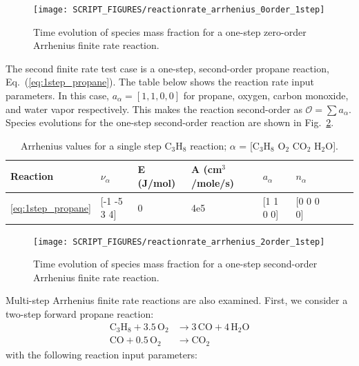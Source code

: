 \documentclass[11pt]{book}
\begin{document}
\begin{figure}[h!]
\centering
\texttt{[image: SCRIPT\_FIGURES/reactionrate\_arrhenius\_0order\_1step]}
\caption[Species evolution in a 0-order 1-step finite rate reaction]{Time evolution of species mass fraction for a one-step zero-order Arrhenius finite rate reaction.}
\label{fig:Arrhenius_0Order_1step}
\end{figure}
The second finite rate test case is a one-step, second-order propane reaction, Eq.~(\ref{eq:1step_propane}). The table below shows the reaction rate input parameters. In this case, $a_{\alpha}=[1,1,0,0]$  for propane, oxygen, carbon monoxide, and water vapor respectively. This makes the reaction second-order as $\mathcal{O}=\sum a_{\alpha}$. Species evolutions for the one-step second-order reaction are shown in Fig.~\ref{fig:Arrhenius_2Order_1step}.
\begin{table}[ht]
\begin{center}
\caption[Arrhenius values for a single step C$_3$H$_8$ reaction]{Arrhenius values for a single step C$_3$H$_8$ reaction; $\alpha$ = [$\mathrm{C_3H_8}$ $\mathrm{O_2}$ $\mathrm{CO_2}$ $\mathrm{H_2O}$].}
\label{single_step_c3h8}
\begin{tabular}{|l|l|l|l|l|l|l|l|l|}
\hline Reaction & $\nu_{\alpha}$ & E (J/mol) & A (cm$^3$/mole/s) & $a_{\alpha}$ & $n_{\alpha}$  \\ \hline \hline
\ref{eq:1step_propane} & [-1 -5 3 4] & 0 & 4e5 & [1 1 0 0] & [0 0 0 0] \\ \hline
\end{tabular}
\end{center}
\end{table}
\begin{figure}[h!]
\centering
\texttt{[image: SCRIPT\_FIGURES/reactionrate\_arrhenius\_2order\_1step]}
\caption[Species evolution in a 2-order 1-step finite rate reaction]{Time evolution of species mass fraction for a one-step second-order Arrhenius finite rate reaction.}
\label{fig:Arrhenius_2Order_1step}
\end{figure}
Multi-step Arrhenius finite rate reactions are also examined. First, we consider a two-step forward propane reaction:
\begin{subequations}
\begin{align}
\label{eq:2step_propane_a}
\mathrm{C_3H_8+3.5 \, O_2} &\rightarrow  \mathrm{3 \, CO + 4 \, H_2O} \\
\label{eq:2step_propane_b}
\mathrm{CO+0.5 \, O_2} &\rightarrow \mathrm{CO_2}
\end{align}
\end{subequations}
with the following reaction input parameters:
\end{document}
